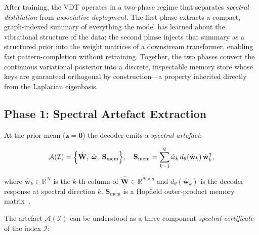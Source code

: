 \documentclass[11pt,a4paper]{article}
\newcommand{\Smat}{\mathbf{S}}
\newcommand{\Wmat}{\mathbf{W}}
\newcommand{\R}{\mathbb{R}}
\newcommand{\T}{^{\intercal}}
\begin{document}
After training, the VDT operates in a two-phase regime that separates
\emph{spectral distillation} from \emph{associative deployment}.
The first phase extracts a compact, graph-indexed summary of everything the
model has learned about the vibrational structure of the data; the second phase
injects that summary as a structured prior into the weight matrices of a
downstream transformer, enabling fast pattern-completion without retraining.
Together, the two phases convert the continuous variational posterior into a
discrete, inspectable memory store whose keys are guaranteed orthogonal by
construction---a property inherited directly from the Laplacian eigenbasis.

\subsection{Phase 1: Spectral Artefact Extraction}
\label{sec:memory:artefact}

At the prior mean ($\mathbf{z}=\mathbf{0}$) the decoder emits a
\emph{spectral artefact}:

\begin{equation}
  \mathcal{A}(\mathcal{I}) = \Bigl\{\hat{\Wmat},\;\hat{\boldsymbol{\omega}},\;
    \Smat_{\mathrm{mem}}\Bigr\},
  \quad
  \Smat_{\mathrm{mem}} = \sum_{k=1}^{q}\hat{\omega}_k\,
  d_\theta(\hat{\mathbf{w}}_k)\,\hat{\mathbf{w}}_k\T,
  \label{eq:artefact}
\end{equation}

where $\hat{\mathbf{w}}_k\in\R^N$ is the $k$-th column of $\hat{\Wmat}\in\R^{N\times q}$
and $d_\theta(\hat{\mathbf{w}}_k)$ is the decoder response at spectral direction $k$.
$\Smat_{\mathrm{mem}}$ is a Hopfield outer-product memory matrix~\cite{hopfield1982}.

The artefact $\mathcal{A}(\mathcal{I})$ can be understood as a three-component
\emph{spectral certificate} of the index $\mathcal{I}$:
\end{document}
